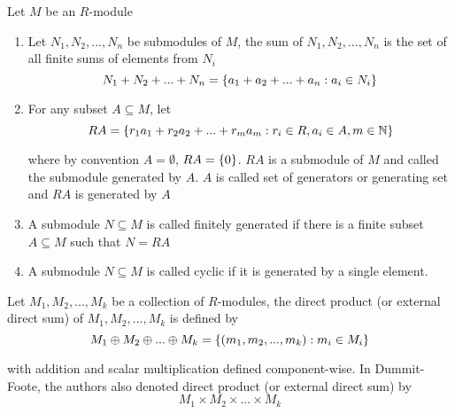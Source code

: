\begin{definition}
	Let $M$ be an $R$-module
	\begin{enumerate}
		\item Let $N_1, N_2, ..., N_n$ be submodules of $M$, the sum of $N_1, N_2, ..., N_n$ is the set of all finite sums of elements from $N_i$
		$$
			N_1 + N_2 + ... + N_n = \{a_1 + a_2 + ... + a_n: a_i \in N_i\}
		$$
		
		\item For any subset $A \subseteq M$, let
		$$
			RA = \{r_1 a_1 + r_2 a_2 + ... + r_m a_m: r_i \in R, a_i \in A, m \in \mathbb{N}\}
		$$
		
		where by convention $A = \emptyset$, $RA = \{0\}$. $RA$ is a submodule of $M$ and called the submodule generated by $A$. $A$ is called set of generators or generating set and $RA$ is generated by $A$
		
		\item A submodule $N \subseteq M$ is called finitely generated if there is a finite subset $A \subseteq M$ such that $N = RA$
		
		\item A submodule $N \subseteq M$ is called cyclic if it is generated by a single element.
	\end{enumerate}
	
	
\end{definition}

\begin{definition}
	Let $M_1, M_2, ..., M_k$ be a collection of $R$-modules, the direct product (or external direct sum) of $M_1, M_2, ..., M_k$ is defined by
	$$
		M_1 \oplus M_2 \oplus ... \oplus M_k = \{(m_1, m_2, ..., m_k): m_i \in M_i\}
	$$
	
	with addition and scalar multiplication defined component-wise. In Dummit-Foote, the authors also denoted direct product (or external direct sum) by
	$$
		M_1 \times M_2 \times ... \times M_k
	$$
\end{definition}

